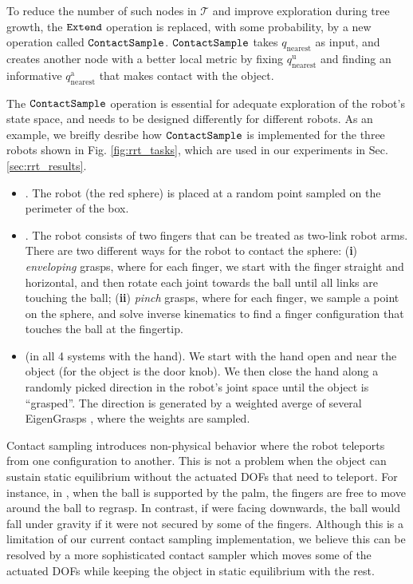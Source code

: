 To reduce the number of such nodes in $\mathcal{T}$ and improve exploration during tree growth, the $\mathtt{Extend}$ operation is replaced, with some probability, by a new operation called $\mathtt{ContactSample}$. $\mathtt{ContactSample}$ takes $q_\mathrm{nearest}$ as input, and creates another node with a better local metric by fixing $q_\mathrm{nearest}^\mathrm{u}$ and finding an informative $q_\mathrm{nearest}^\mathrm{a}$ that makes contact with the object. 

The $\mathtt{ContactSample}$ operation is essential for adequate exploration of the robot's state space, and needs to be designed differently for different robots. 
As an example, we breifly desribe how $\mathtt{ContactSample}$ is implemented for the three robots shown in Fig. \ref{fig:rrt_tasks}, which are used in our experiments in Sec. \ref{sec:rrt_results}. 
\begin{itemize}
\item {}. The robot (the red sphere) is placed at a random point sampled on the perimeter of the box. 
\item {}. The robot consists of two fingers that can be treated as two-link robot arms. There are two different ways for the robot to contact the sphere: 
(\textbf{i}) \emph{enveloping} grasps, where for each finger, we start with the finger straight and horizontal, and then rotate each joint towards the ball until all links are touching the ball; 
(\textbf{ii}) \emph{pinch} grasps, where for each finger, we sample a point on the sphere, and solve inverse kinematics to find a finger configuration that touches the ball at the fingertip. 
\item {} (in all 4 systems with the hand). We start with the hand open and near the object (for  the object is the door knob). We then close the hand along a randomly picked direction in the robot's joint space until the object is ``grasped''.  The direction is generated by a weighted averge of several EigenGrasps \cite{eigengrasp}, where the weights are sampled. 
\end{itemize}  

Contact sampling introduces non-physical behavior where the robot teleports from one configuration to another. This is not a problem when the object can sustain static equilibrium without the actuated DOFs that need to teleport. For instance, in , when the ball is supported by the palm, the fingers are free to move around the ball to regrasp. In contrast, if  were facing downwards, the ball would fall under gravity if it were not secured by some of the fingers. Although this is a limitation of our current contact sampling implementation, we believe this can be resolved by a more sophisticated contact sampler which moves some of the actuated DOFs while keeping the object in static equilibrium with the rest. 

